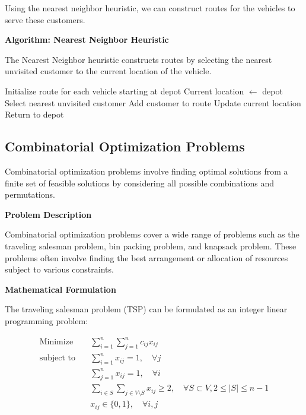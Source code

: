 \documentclass[12pt]{book} %
\begin{document}
Using the nearest neighbor heuristic, we can construct routes for the vehicles to serve these customers.

\textbf{Algorithm: Nearest Neighbor Heuristic}

The Nearest Neighbor heuristic constructs routes by selecting the nearest unvisited customer to the current location of the vehicle.

\begin{algorithm}[H]
\caption{Nearest Neighbor Heuristic}\label{alg:nearest-neighbor}
\begin{algorithmic}[1]
    \State Initialize route for each vehicle starting at depot
        \State Current location $\gets$ depot
            \State Select nearest unvisited customer
            \State Add customer to route
            \State Update current location
        \EndWhile
        \State Return to depot
    \EndFor
\EndProcedure
\end{algorithmic}
\end{algorithm}

\subsection{Combinatorial Optimization Problems}

Combinatorial optimization problems involve finding optimal solutions from a finite set of feasible solutions by considering all possible combinations and permutations.

\textbf{Problem Description}

Combinatorial optimization problems cover a wide range of problems such as the traveling salesman problem, bin packing problem, and knapsack problem. These problems often involve finding the best arrangement or allocation of resources subject to various constraints.

\textbf{Mathematical Formulation}

The traveling salesman problem (TSP) can be formulated as an integer linear programming problem:

\[
\begin{aligned}
\text{Minimize} \quad & \sum_{i=1}^{n} \sum_{j=1}^{n} c_{ij} x_{ij} \\
\text{subject to} \quad & \sum_{i=1}^{n} x_{ij} = 1, \quad \forall j \\
& \sum_{j=1}^{n} x_{ij} = 1, \quad \forall i \\
& \sum_{i \in S} \sum_{j \in V \setminus S} x_{ij} \geq 2, \quad \forall S \subset V, 2 \leq |S| \leq n-1 \\
& x_{ij} \in \{0, 1\}, \quad \forall i, j
\end{aligned}
\]
\end{document}
